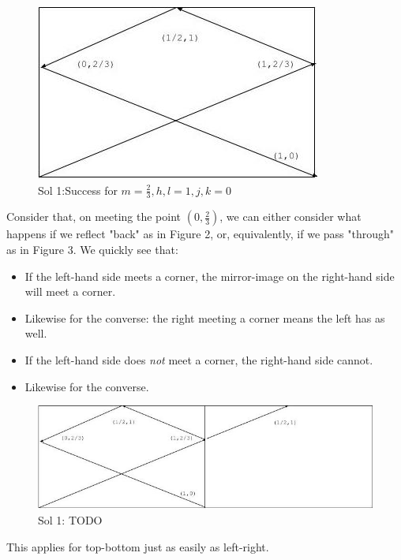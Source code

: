 \documentclass[11pt, oneside]{article} 	%
\begin{document}
\begin{figure}[!htb]
\centering
\includegraphics[scale=.5]{problem1trajectory}
 \caption{Sol 1:Success for $m = \frac{2}{3}, h, l = 1, j, k = 0$}
\end{figure}

Consider that, on meeting the point $(0, \frac{2}{3})$, we can either consider what happens if we reflect "back" as in Figure 2, or, equivalently, if we pass "through" as in Figure 3.  We quickly see that:



\begin{itemize} 
\item If the left-hand side meets a corner, the mirror-image on the right-hand side will meet a corner.
\item Likewise for the converse: the right meeting a corner means the left has as well.
\item If the left-hand side does \emph{not} meet a corner, the right-hand side cannot.
\item Likewise for the converse.
\end{itemize}


\begin{figure}[!htb]
\centering
\includegraphics[scale=.5]{mirrorright}
 \caption{Sol 1: TODO}
\end{figure}

This applies for top-bottom just as easily as left-right.
\end{document}
